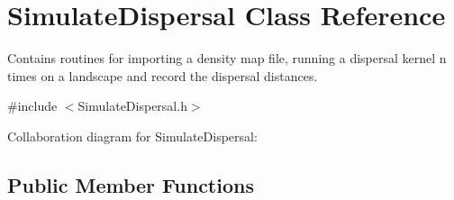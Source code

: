 \hypertarget{class_simulate_dispersal}{}\section{Simulate\+Dispersal Class Reference}
\label{class_simulate_dispersal}


Contains routines for importing a density map file, running a dispersal kernel n times on a landscape and record the dispersal distances.  




{\ttfamily \#include $<$Simulate\+Dispersal.\+h$>$}



Collaboration diagram for Simulate\+Dispersal\+:
\subsection*{Public Member Functions}
